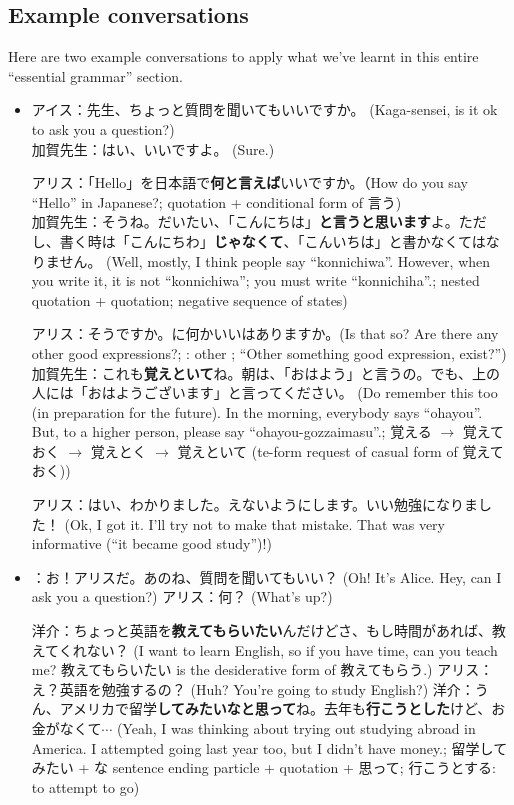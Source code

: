 \documentclass[../nihongo-gakushuu-kyouzai.tex]{subfiles}
\begin{document}
\subsection{Example conversations}
Here are two example conversations to apply what we've learnt in this entire ``essential grammar'' section.

\begin{itemize}
    \item アイス：先生、ちょっと質問を聞いてもいいですか。 (Kaga-sensei, is it ok to ask you a question?) \\
    加賀先生：はい、いいですよ。 (Sure.)

    アリス：「Hello」を日本語で\textbf{何と言えば}いいですか。（How do you say ``Hello'' in Japanese?; quotation + conditional form of 言う)\\
    加賀先生：そうね。だいたい、「こんにちは」\textbf{と言うと思います}よ。ただし、書く時は「こんにちわ」\textbf{じゃなくて}、「こんいちは」と書かなくてはなりません。 (Well, mostly, I think people say ``konnichiwa''. However, when you write it, it is not ``konnichiwa''; you must write ``konnichiha''.; nested quotation + quotation; negative sequence of states)

    アリス：そうですか。に何かいいはありますか。(Is that so? Are there any other good expressions?; : other ; ``Other something good expression, exist?'')\\
    加賀先生：これも\textbf{覚えといて}ね。朝は、「おはよう」と言うの。でも、上の人には「おはようございます」と言ってください。 (Do remember this too (in preparation for the future). In the morning, everybody says ``ohayou''. But, to a higher person, please say ``ohayou-gozzaimasu''.; 覚える $\to$ 覚えておく $\to$ 覚えとく $\to$ 覚えといて (te-form request of casual form of 覚えておく))

    アリス：はい、わかりました。えないようにします。いい勉強になりました！ (Ok, I got it. I'll try not to make that mistake. That was very informative (``it became good study'')!)
    \item {}：お！アリスだ。あのね、質問を聞いてもいい？ (Oh! It's Alice. Hey, can I ask you a question?)
    アリス：何？ (What's up?)

    洋介：ちょっと英語を\textbf{教えてもらいたい}んだけどさ、もし時間があれば、教えてくれない？ (I want to learn English, so if you have time, can you teach me? 教えてもらいたい is the desiderative form of 教えてもらう.)
    アリス：え？英語を勉強するの？ (Huh? You're going to study English?)
    洋介：うん、アメリカで留学\textbf{してみたいなと思って}ね。去年も\textbf{行こうとした}けど、お金がなくて$\cdots$ (Yeah, I was thinking about trying out studying abroad in America. I attempted going last year too, but I didn't have money.; 留学してみたい + な sentence ending particle + quotation + 思って; 行こうとする: to attempt to go)


\end{itemize}
\end{document}
